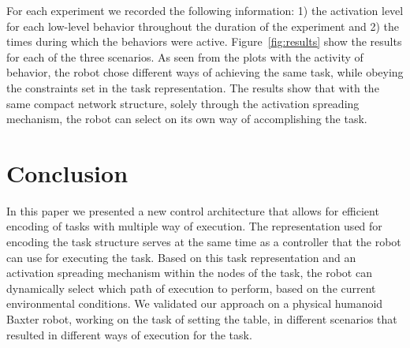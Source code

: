 \documentclass[letterpaper, 10 pt, conference]{ieeeconf}  %
\begin{document}

For each experiment we recorded the following information: 1) the activation level for each low-level behavior throughout the duration of the experiment and 2) the times during which the behaviors were active. Figure~\ref{fig:results} show the results for each of the three scenarios. As seen from the plots with the activity of behavior, the robot chose different ways of achieving the same task, while obeying the constraints set in the task representation. The results show that with the same compact network structure, solely through the activation spreading mechanism, the robot can select on its own way of accomplishing the task.


\section{Conclusion}
\label{conclusion}
In this paper we presented a new control architecture that allows for efficient encoding of tasks with multiple way of execution. The representation used for encoding the task structure serves at the same time as a controller that the robot can use for executing the task. Based on this task representation and an activation spreading mechanism within the nodes of the task, the robot can dynamically select which path of execution to perform, based on the current environmental conditions. We validated our approach on a physical humanoid Baxter robot, working on the task of setting the table, in different scenarios that resulted in different ways of execution for the task.



\end{document}
